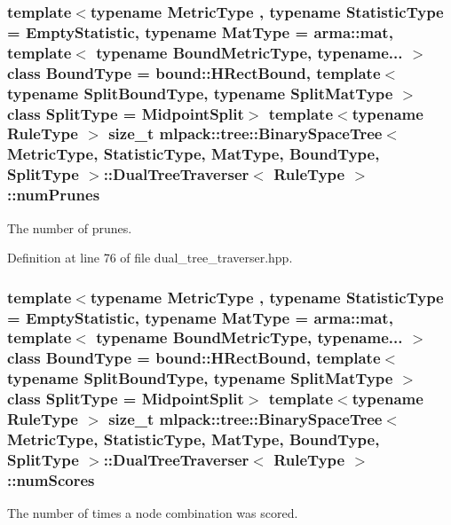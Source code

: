 \subsubsection[{num\+Prunes}]{\setlength{\rightskip}{0pt plus 5cm}template$<$typename Metric\+Type , typename Statistic\+Type  = Empty\+Statistic, typename Mat\+Type  = arma\+::mat, template$<$ typename Bound\+Metric\+Type, typename... $>$ class Bound\+Type = bound\+::\+H\+Rect\+Bound, template$<$ typename Split\+Bound\+Type, typename Split\+Mat\+Type $>$ class Split\+Type = Midpoint\+Split$>$ template$<$typename Rule\+Type $>$ size\+\_\+t {\bf mlpack\+::tree\+::\+Binary\+Space\+Tree}$<$ Metric\+Type, Statistic\+Type, Mat\+Type, Bound\+Type, Split\+Type $>$\+::{\bf Dual\+Tree\+Traverser}$<$ Rule\+Type $>$\+::num\+Prunes\hspace{0.3cm}{\ttfamily [private]}}\label{classmlpack_1_1tree_1_1BinarySpaceTree_1_1DualTreeTraverser_a1e685f75fdd7869bddebb26fe8950555}


The number of prunes. 



Definition at line 76 of file dual\+\_\+tree\+\_\+traverser.\+hpp.

\subsubsection[{num\+Scores}]{\setlength{\rightskip}{0pt plus 5cm}template$<$typename Metric\+Type , typename Statistic\+Type  = Empty\+Statistic, typename Mat\+Type  = arma\+::mat, template$<$ typename Bound\+Metric\+Type, typename... $>$ class Bound\+Type = bound\+::\+H\+Rect\+Bound, template$<$ typename Split\+Bound\+Type, typename Split\+Mat\+Type $>$ class Split\+Type = Midpoint\+Split$>$ template$<$typename Rule\+Type $>$ size\+\_\+t {\bf mlpack\+::tree\+::\+Binary\+Space\+Tree}$<$ Metric\+Type, Statistic\+Type, Mat\+Type, Bound\+Type, Split\+Type $>$\+::{\bf Dual\+Tree\+Traverser}$<$ Rule\+Type $>$\+::num\+Scores\hspace{0.3cm}{\ttfamily [private]}}\label{classmlpack_1_1tree_1_1BinarySpaceTree_1_1DualTreeTraverser_afef4eddce6f14acd743f239935f1c13b}


The number of times a node combination was scored. 



